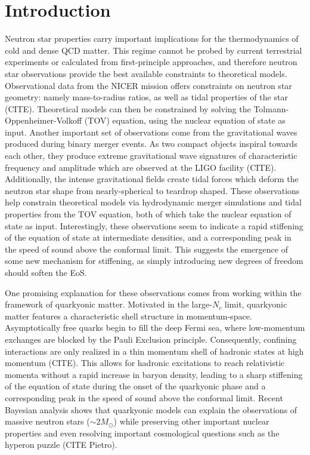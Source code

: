 \documentclass[twocolumn,floatfix,superscriptaddress,a4paper,showkeys,nofootinbib,reprint]{revtex4-1}
\begin{document}
\section{Introduction}
\label{sec:intro}


Neutron star properties carry important implications for the thermodynamics of cold and dense QCD matter. This regime cannot be probed by current terrestrial experiments or calculated from first-principle approaches, and therefore neutron star observations provide the best available constraints to theoretical models. Observational data from the NICER mission offers constraints on neutron star geometry: namely mass-to-radius ratios, as well as tidal properties of the star (CITE). Theoretical models can then be constrained by solving the Tolmann-Oppenheimer-Volkoff (TOV) equation, using the nuclear equation of state as input. Another important set of observations come from the gravitational waves produced during binary merger events. As two compact objects inspiral towards each other, they produce extreme gravitational wave signatures of characteristic frequency and amplitude which are observed at the LIGO facility (CITE). Additionally, the intense gravitational fields create tidal forces which deform the neutron star shape from nearly-spherical to teardrop shaped. These observations help constrain theoretical models via hydrodynamic merger simulations and tidal properties from the TOV equation, both of which take the nuclear equation of state as input. Interestingly, these observations seem to indicate a rapid stiffening of the equation of state at intermediate densities, and a corresponding peak in the speed of sound above the conformal limit. This suggests the emergence of some new mechanism for stiffening, as simply introducing new degrees of freedom should soften the EoS. 

One promising explanation for these observations comes from working within the framework of quarkyonic matter. Motivated in the large-$N_c$ limit, quarkyonic matter features a characteristic shell structure in momentum-space. Asymptotically free quarks begin to fill the deep Fermi sea, where low-momentum exchanges are blocked by the Pauli Exclusion principle. Consequently, confining interactions are only realized in a thin momentum shell of hadronic states at high momentum (CITE). This allows for hadronic excitations to reach relativistic momenta without a rapid increase in baryon density, leading to a sharp stiffening of the equation of state during the onset of the quarkyonic phase and a corresponding peak in the speed of sound above the conformal limit. Recent Bayesian analysis shows that quarkyonic models can explain the observations of massive neutron stars ($\sim2M_{\odot}$) while preserving other important nuclear properties and even resolving important cosmological questions such as the hyperon puzzle (CITE Pietro).
\end{document}
